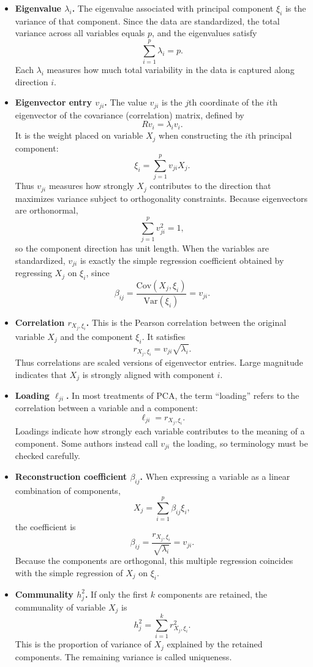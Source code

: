 \begin{itemize}[itemsep=0.6em, label=$\circ$]

\item \textbf{Eigenvalue $\lambda_i$.}  
The eigenvalue associated with principal component $\xi_i$ is the variance of that component. Since the data are standardized, the total variance across all variables equals $p$, and the eigenvalues satisfy
\[
\sum_{i=1}^p \lambda_i = p.
\]
Each $\lambda_i$ measures how much total variability in the data is captured along direction $i$.

\item \textbf{Eigenvector entry $v_{ji}$.}  
The value $v_{ji}$ is the $j$th coordinate of the $i$th eigenvector of the covariance (correlation) matrix, defined by
\[
R v_i = \lambda_i v_i.
\]
It is the weight placed on variable $X_j$ when constructing the $i$th principal component:
\[
\xi_i = \sum_{j=1}^p v_{ji} X_j.
\]
Thus $v_{ji}$ measures how strongly $X_j$ contributes to the direction that maximizes variance subject to orthogonality constraints. Because eigenvectors are orthonormal,
\[
\sum_{j=1}^p v_{ji}^2 = 1,
\]
so the component direction has unit length. When the variables are standardized, $v_{ji}$ is exactly the simple regression coefficient obtained by regressing $X_j$ on $\xi_i$, since
\[
\beta_{ij} = \frac{\mathrm{Cov}(X_j,\xi_i)}{\mathrm{Var}(\xi_i)} = v_{ji}.
\]

\item \textbf{Correlation $r_{X_j,\xi_i}$.}  
This is the Pearson correlation between the original variable $X_j$ and the component $\xi_i$. It satisfies
\[
r_{X_j,\xi_i} = v_{ji}\sqrt{\lambda_i}.
\]
Thus correlations are scaled versions of eigenvector entries. Large magnitude indicates that $X_j$ is strongly aligned with component $i$.

\item \textbf{Loading $\ell_{ji}$.}  
In most treatments of PCA, the term “loading” refers to the correlation between a variable and a component:
\[
\ell_{ji} = r_{X_j,\xi_i}.
\]
Loadings indicate how strongly each variable contributes to the meaning of a component. Some authors instead call $v_{ji}$ the loading, so terminology must be checked carefully.

\item \textbf{Reconstruction coefficient $\beta_{ij}$.}  
When expressing a variable as a linear combination of components,
\[
X_j = \sum_{i=1}^p \beta_{ij}\xi_i,
\]
the coefficient is
\[
\beta_{ij} = \frac{r_{X_j,\xi_i}}{\sqrt{\lambda_i}} = v_{ji}.
\]
Because the components are orthogonal, this multiple regression coincides with the simple regression of $X_j$ on $\xi_i$.

\item \textbf{Communality $h_j^2$.}  
If only the first $k$ components are retained, the communality of variable $X_j$ is
\[
h_j^2 = \sum_{i=1}^k r_{X_j,\xi_i}^2.
\]
This is the proportion of variance of $X_j$ explained by the retained components. The remaining variance is called uniqueness.

\end{itemize}

